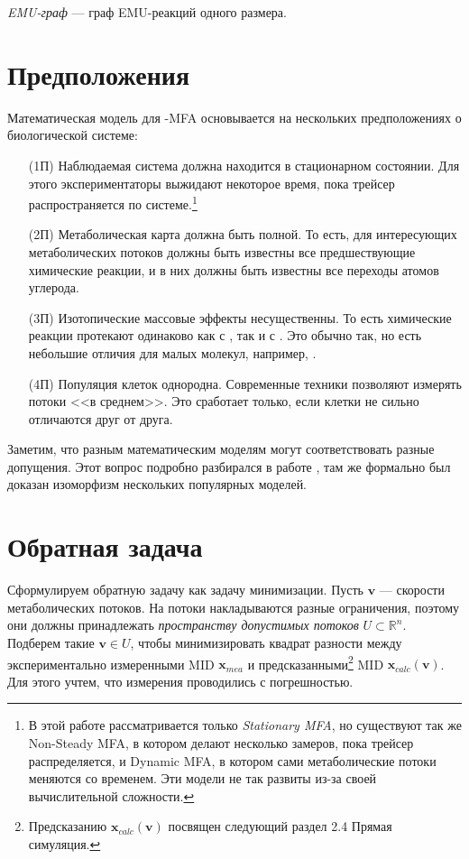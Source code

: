 \documentclass[14pt, a4paper]{extreport}
\begin{document}
\hangindent=1cm \noindent
\emph{EMU-граф} --- граф EMU-реакций одного размера.



\clearpage

\section{Предположения}
Математическая модель для -MFA основывается на нескольких предположениях о биологической системе\cite{Wiechert_1997_1}:
\begin{enumerate}
	\item[(1П)] Наблюдаемая система должна находится в стационарном состоянии. Для этого экспериментаторы выжидают некоторое время, пока трейсер распространяется по системе.\footnote{В этой работе рассматривается только \emph{Stationary MFA}, но существуют так же Non-Steady MFA\cite{NMFA}, в котором делают несколько замеров, пока трейсер распределяется, и Dynamic MFA\cite{DMFA}, в котором сами метаболические потоки меняются со временем. Эти модели не так развиты из-за своей вычислительной сложности.}
	
	\item[(2П)] Метаболическая карта должна быть полной. То есть, для интересующих метаболических потоков должны быть известны все предшествующие химические реакции, и в них должны быть известны все переходы атомов углерода.
	
	\item[(3П)] Изотопические массовые эффекты несущественны. То есть химические реакции протекают одинаково как с , так и с . Это обычно так, но есть небольшие отличия для малых молекул, например, .
	
	\item[(4П)] Популяция клеток однородна. Современные техники позволяют измерять потоки <<в среднем>>. Это сработает только, если клетки не сильно отличаются друг от друга.
\end{enumerate}

Заметим, что разным математическим моделям могут соответствовать разные допущения. Этот вопрос подробно разбирался в работе \cite{formalizm_2017}, там же формально был доказан изоморфизм нескольких популярных моделей.
\clearpage


\section{Обратная задача}

Сформулируем обратную задачу как задачу минимизации. Пусть $\mathbf{v}$ --- скорости метаболических потоков. На потоки накладываются разные ограничения, поэтому они должны принадлежать \emph{пространству допустимых потоков} $U \subset \mathbb{R}^n$. Подберем такие $\mathbf{v} \in U$, чтобы минимизировать квадрат разности между экспериментально измеренными MID $\mathbf{x}_{mea}$ и предсказанными\footnote{Предсказанию $\mathbf{x}_{calc}(\mathbf{v})$ посвящен следующий раздел 2.4 Прямая симуляция.} MID $\mathbf{x}_{calc}(\mathbf{v})$. Для этого учтем, что измерения проводились с погрешностью. 
\end{document}
